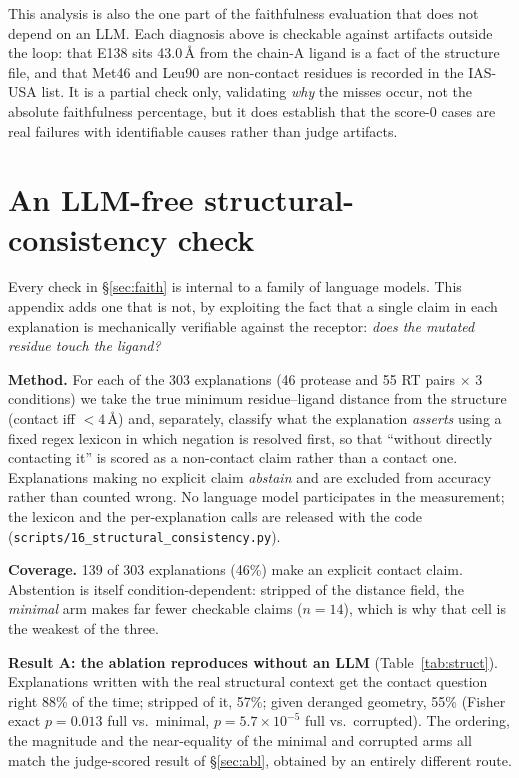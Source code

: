 \documentclass{article}
\begin{document}
This analysis is also the one part of the faithfulness evaluation that does not
depend on an LLM. Each diagnosis above is checkable against artifacts outside the
loop: that E138 sits 43.0\,\AA{} from the chain-A ligand is a fact of the
structure file, and that Met46 and Leu90 are non-contact residues is recorded in
the IAS-USA list. It is a partial check only, validating \emph{why} the misses
occur, not the absolute faithfulness percentage, but it does establish that the
score-0 cases are real failures with identifiable causes rather than judge
artifacts.

\section{An LLM-free structural-consistency check}
\label{app:struct}

Every check in \S\ref{sec:faith} is internal to a family of language models. This
appendix adds one that is not, by exploiting the fact that a single claim in each
explanation is mechanically verifiable against the receptor: \emph{does the mutated
residue touch the ligand?}

\textbf{Method.} For each of the 303 explanations (46 protease and 55 RT pairs
$\times$ 3 conditions) we take the true minimum residue--ligand distance from the
structure (contact iff $<4$\,\AA) and, separately, classify what the explanation
\emph{asserts} using a fixed regex lexicon in which negation is resolved first, so
that ``without directly contacting it'' is scored as a non-contact claim rather
than a contact one. Explanations making no explicit claim \emph{abstain} and are
excluded from accuracy rather than counted wrong. No language model participates
in the measurement; the lexicon and the per-explanation calls are released with
the code (\texttt{scripts/16\_structural\_consistency.py}).

\textbf{Coverage.} 139 of 303 explanations (46\%) make an explicit contact claim.
Abstention is itself condition-dependent: stripped of the distance field, the
\emph{minimal} arm makes far fewer checkable claims ($n=14$), which is why that
cell is the weakest of the three.

\textbf{Result A: the ablation reproduces without an LLM} (Table~\ref{tab:struct}).
Explanations written with the real structural context get the contact question
right 88\% of the time; stripped of it, 57\%; given deranged geometry, 55\%
(Fisher exact $p=0.013$ full vs.\ minimal, $p=5.7\times10^{-5}$ full vs.\
corrupted). The ordering, the magnitude and the near-equality of the minimal and
corrupted arms all match the judge-scored result of \S\ref{sec:abl}, obtained by
an entirely different route.
\end{document}
